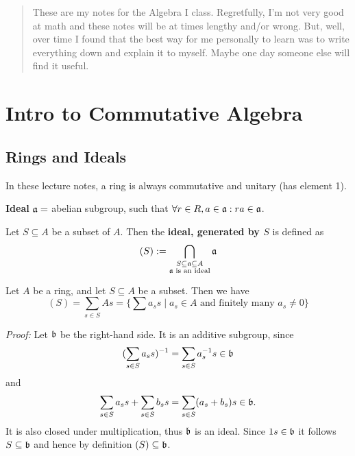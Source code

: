 
\usepackage{enumitem}
\usepackage{stmaryrd}

\newcommand{\QT}{\mathbb{Q}[T]}
\newcommand{\ZT}{\mathbb{Z}[T]}
\newcommand{\bigslant}[2]{{\raisebox{.1em}{$#1$}\left/\raisebox{-.1em}{$#2$}\right.}}
\setcounter{MaxMatrixCols}{11}
\DeclareRobustCommand\longtwoheadrightarrow
     {\relbar\joinrel\twoheadrightarrow}
     


\maketitle

\begin{abstract}
\noindent These are my notes for the Algebra I class. Regretfully, I'm not very good at math and these notes will be at times lengthy and/or wrong. But, well, over time I found that the best way for me personally to learn was to write everything down and explain it to myself. Maybe one day someone else will find it useful.
\end{abstract}

\tableofcontents

\newpage

\section{Intro to Commutative Algebra}\label{sec:page-layout}
\subsection{Rings and Ideals}\label{sec:headings}

In these lecture notes, a ring is always commutative and unitary (has element 1).
\begin{definition}
    \textbf{Ideal} $\mathfrak{a} =$ abelian subgroup, such that $\forall r\in R, a\in \mathfrak{a} : ra \in \mathfrak{a}$.  
\end{definition}

\begin{definition}\label{IdealGenerated}
    Let $S\subseteq A$ be a subset of $A$. Then the \textbf{ideal, generated by $S$} is defined as 
    $$(S):= \bigcap_{\substack{S\subseteq \mathfrak{a} \subseteq A \\ \text{$\mathfrak{a}$ is an ideal}}} \mathfrak{a}$$
\end{definition}

\begin{lemma}
    Let $A$ be a ring, and let $S\subseteq A$ be a subset. Then we have
    $$(S)=\sum_{s\in S} As = \{ \sum a_s s \mid a_s \in A \text{ and finitely many } a_s \neq 0 \}$$
\end{lemma}
\textit{Proof:} Let $\mathfrak{b}$ be the right-hand side. It is an additive subgroup, since 
$$ (\sum_{s\in S} a_s s)^{-1} = \sum_{s\in S} a_s^{-1} s \in \mathfrak{b}$$
and 
$$ \sum_{s\in S} a_s s + \sum_{s\in S} b_s s = \sum_{s\in S} (a_s+b_s) s \in \mathfrak{b}.$$
It is also closed under multiplication, thus $\mathfrak{b}$ is an ideal. Since $1s\in \mathfrak{b}$ it follows $S\subseteq \mathfrak{b}$ and hence by definition $(S) \subseteq \mathfrak{b}$.

